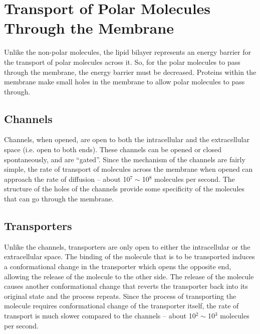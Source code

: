 \section{Transport of Polar Molecules Through the Membrane}

Unlike the non-polar molecules, the lipid bilayer represents an energy barrier for the transport of polar molecules across it.
So, for the polar molecules to pass through the membrane, the energy barrier must be decreased.
Proteins within the membrane make small holes in the membrane to allow polar molecules to pass through.

\subsection{Channels}

\begin{center}
\end{center}

Channels, when opened, are open to both the intracellular and the extracellular space (i.e. open to both ends).
These channels can be opened or closed spontaneously, and are ``gated''.
Since the mechanism of the channels are fairly simple, the rate of transport of molecules across the membrane when opened can approach the rate of diffusion -- about 10$^7\sim$10$^8$ molecules per second.
The structure of the holes of the channels provide some specificity of the molecules that can go through the membrane.

\subsection{Transporters}

\begin{center}
\end{center}

Unlike the channels, transporters are only open to either the intracellular or the extracellular space.
The binding of the molecule that is to be transported induces a conformational change in the transporter which opens the opposite end, allowing the release of the molecule to the other side.
The release of the molecule causes another conformational change that reverts the transporter back into its original state and the process repeats.
Since the process of transporting the molecule requires conformational change of the transporter itself, the rate of transport is much slower compared to the channels -- about 10$^2\sim$10$^3$ molecules per second.

